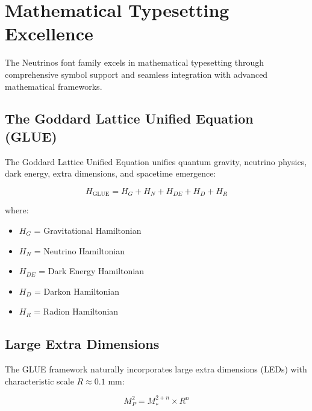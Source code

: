 \documentclass[11pt,letterpaper]{article}
\begin{document}
\newpage


\section{Mathematical Typesetting Excellence}

The Neutrinos font family excels in mathematical typesetting through comprehensive symbol support and seamless integration with advanced mathematical frameworks.

\subsection{The Goddard Lattice Unified Equation (GLUE)}

\begin{tcolorbox}[colback=neutrinoblue!10,colframe=spacetimeblack,title={\semiboldfont The GLUE Framework}]
The Goddard Lattice Unified Equation unifies quantum gravity, neutrino physics, dark energy, extra dimensions, and spacetime emergence:

\begin{equation}
\boxed{H_{\text{GLUE}} = H_G + H_N + H_{DE} + H_D + H_R}
\end{equation}

where:
\begin{itemize}[leftmargin=2cm]
    \item $H_G$ = Gravitational Hamiltonian
    \item $H_N$ = Neutrino Hamiltonian  
    \item $H_{DE}$ = Dark Energy Hamiltonian
    \item $H_D$ = Darkon Hamiltonian
    \item $H_R$ = Radion Hamiltonian
\end{itemize}
\end{tcolorbox}

\subsection{Large Extra Dimensions}

The GLUE framework naturally incorporates large extra dimensions (LEDs) with characteristic scale $R \approx 0.1$ mm:

\begin{equation}
M_P^2 = M_*^{2+n} \times R^n
\end{equation}
\end{document}
